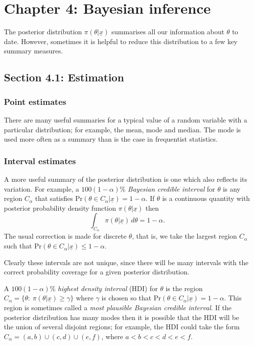 \chapter{Chapter 4: Bayesian inference}
The posterior distribution $\pi(\theta|\underline{x})$ summarises all our
information about $\theta$ to date. However, sometimes it is
helpful to reduce this distribution to a few key summary measures.

\section{Section 4.1: Estimation}
\subsection*{Point estimates}
There are many useful summaries for a typical value of a random
variable with a particular distribution; for example, the mean, mode
and median. The mode is used more often as a summary than is the case
in frequentist statistics.

\subsection*{Interval estimates}
A more useful summary of the posterior distribution is one which also
reflects its variation.  For example, a $100(1-\alpha)\%$ {\it Bayesian
credible interval} for $\theta$ is any region $C_\alpha$ that
satisfies $\text{Pr}(\theta\in C_\alpha|\underline{x})=1-\alpha$. If $\theta$
is a continuous quantity with posterior probability density function
$\pi(\theta|\underline{x})$ then
\begin{equation*}
\int_{C_\alpha} \pi(\theta|\underline{x})\,d\theta = 1-\alpha.
\end{equation*}
The usual correction is made for discrete $\theta$, that is, we
take the largest region $C_\alpha$ such that $\text{Pr}(\theta\in
C_\alpha|\underline{x})\leq 1-\alpha$. 

Clearly these intervals are not unique, since there will be many
intervals with the correct probability coverage for a given posterior
distribution.

A $100(1-\alpha)\%$ \emph{highest density interval} (HDI)  for
$\theta$ is the region
$C_\alpha=\{\theta:~\pi(\theta|\underline{x})\geq\gamma\}$ where
$\gamma$ is chosen so that $\text{Pr}(\theta\in C_\alpha|\underline{x})=1-\alpha$.
This region is sometimes called a {\it most plausible Bayesian credible interval}. If the posterior distribution has many modes
then it is possible that the HDI will be the union of several
disjoint regions; for example, the HDI could take the form
$C_\alpha=(a,b)\cup(c,d)\cup(e,f)$, where $a<b<c<d<e<f$.

